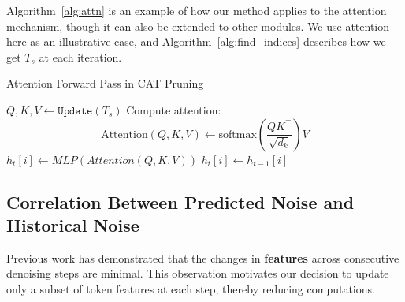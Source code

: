 \documentclass[10pt]{article}
\begin{document}
Algorithm~\ref{alg:attn} is an example of how our method applies to the attention mechanism, though it can also be extended to other modules. We use attention here as an illustrative case, and Algorithm~\ref{alg:find_indices} describes how we get $T_s$ at each iteration.
\begin{algorithm}
\caption{Attention Forward Pass in CAT Pruning}
\label{alg:attn}
\begin{algorithmic}[1]

\State  $Q, K, V \gets \texttt{Update}(T_s)$
\State Compute attention: 
\[
\text{Attention}(Q, K, V) \gets \text{softmax}\left(\frac{QK^\top}{\sqrt{d_k}}\right)V
\]
    \State $h_t[i] \gets MLP(Attention(Q,K,V))$  
\EndFor
{}
    \State $h_t[i] \gets h_{t-1}[i]$  
\EndFor
\end{algorithmic}
\end{algorithm}






\subsection{Correlation Between Predicted Noise and Historical Noise}
\label{sec::noise mag}

Previous work has demonstrated that the changes in \textbf{features} across consecutive denoising steps are minimal. This observation motivates our decision to update only a subset of token features at each step, thereby reducing computations.
\end{document}
